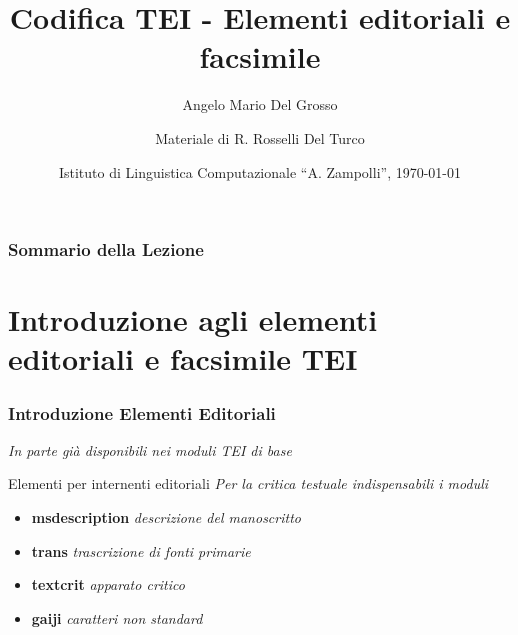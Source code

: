 \documentclass{beamer}
\title{Codifica TEI - Elementi editoriali e facsimile}
\author[A.M. Del Grosso]{Angelo Mario Del Grosso}
\author[R. Rosselli Del Turco]{Materiale di R. Rosselli Del Turco}
\institute{\texttt{angelo.delgrosso@ilc.cnr.it} \\\bigskip\textit{CNR-ILC-LicoLab} \\\bigskip\url{http://licolab.ilc.cnr.it/}}
\date{Istituto di Linguistica Computazionale ``A. Zampolli'', \today}
\begin{document}
    
    \begin{frame}
        \maketitle
    \end{frame}
    
    \begin{frame}
        \frametitle{Sommario della Lezione}
        \tableofcontents
    \end{frame}
    
    \section{Introduzione agli elementi editoriali e facsimile TEI}
    
    \begin{frame}
        \frametitle{Introduzione Elementi Editoriali}
        \addtocounter{nframe}{1}
        
        \textit{In parte già disponibili nei moduli TEI di base}

        \begin{block}{Elementi per internenti editoriali}
            \emph{Per la critica testuale indispensabili i moduli}
            \begin{itemize}
                \item \textbf{msdescription} \textit{descrizione del manoscritto} 
                \item \textbf{trans} \textit{trascrizione di fonti primarie }
                \item \textbf{textcrit} \textit{apparato critico}
                \item \textbf{gaiji} \textit{caratteri non standard}
            \end{itemize}
        \end{block}
        
    \end{frame}
    
\end{document}
